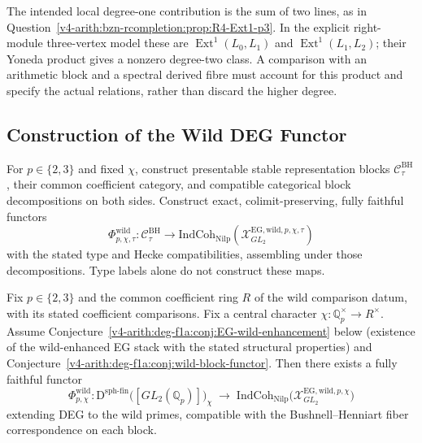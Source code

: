 \begin{remark}
\label{v4-arith:deg-f1a:rem:wild-EG-p3}
The intended local degree-one contribution is the sum of two lines,
as in Question~\ref{v4-arith:bzn-rcompletion:prop:R4-Ext1-p3}.
In the explicit right-module three-vertex model these are
\(\operatorname{Ext}^1(L_0,L_1)\) and
\(\operatorname{Ext}^1(L_1,L_2)\); their Yoneda product gives a
nonzero degree-two class. A comparison with an arithmetic block
and a spectral derived fibre must account for this product and
specify the actual relations, rather than discard the higher degree.
\end{remark}

\subsection{Construction of the Wild DEG Functor}

\begin{conjecture}
\label{v4-arith:deg-f1a:conj:wild-block-functor}
For \(p\in\{2,3\}\) and fixed \(\chi\), construct presentable
stable representation blocks \(\mathcal C_\tau^{\mathrm{BH}}\),
their common coefficient category, and compatible categorical
block decompositions on both sides. Construct exact,
colimit-preserving, fully faithful functors
\[
 \Phi^{\mathrm{wild}}_{p,\chi,\tau}:\mathcal C_\tau^{\mathrm{BH}}
 \longrightarrow\mathrm{IndCoh}_{\mathrm{Nilp}}
 (\mathcal X^{\mathrm{EG,wild},p,\chi,\tau}_{GL_2})
\]
with the stated type and Hecke compatibilities, assembling under
those decompositions. Type labels alone do not construct these maps.
\end{conjecture}

\begin{theorem}[existence of wild DEG functor at \(p=2,3\)]
\label{v4-arith:deg-f1a:thm:wild-functor-existence}
Fix \(p\in\{2,3\}\) and the common coefficient ring \(R\) of the
wild comparison datum, with its stated coefficient comparisons. Fix a central
character \(\chi:\mathbb Q_p^\times\to R^\times\).
Assume Conjecture~\ref{v4-arith:deg-f1a:conj:EG-wild-enhancement} below
(existence of the wild-enhanced EG stack with the stated structural
properties) and
Conjecture~\ref{v4-arith:deg-f1a:conj:wild-block-functor}. Then there exists a
fully faithful functor
\begin{equation}
\label{v4-arith:deg-f1a:eq:wild-functor}
\Phi^{\mathrm{wild}}_{p,\chi}\colon
\mathrm{D}^{\mathrm{sph\text{-}fin}}\bigl([GL_{2}(\mathbb{Q}_{p})]\bigr)_{\chi}
\;\longrightarrow\;\mathrm{IndCoh}_{\mathrm{Nilp}}\bigl(\mathcal{X}^{\mathrm{EG,wild},p,\chi}_{GL_{2}}\bigr)
\end{equation}
extending DEG to the wild primes, compatible with the
Bushnell--Henniart fiber correspondence on each block.
\end{theorem}

